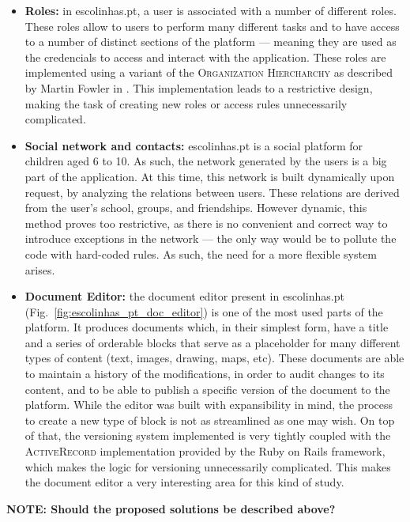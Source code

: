 \begin{itemize}
  \item \textbf{Roles:} in escolinhas.pt, a user is associated with a number of different roles. These roles allow to users to perform many different tasks and to have access to a number of distinct sections of the platform --- meaning they are used as the credencials to access and interact with the application. These roles are implemented using a variant of the \textsc{Organization Hiercharchy} as described by Martin Fowler in \cite{fowler_accountability}. This implementation leads to a restrictive design, making the task of creating new roles or access rules unnecessarily complicated.\\
  
  \item \textbf{Social network and contacts:} escolinhas.pt is a social platform for children aged 6 to 10. As such, the network generated by the users is a big part of the application. At this time, this network is built dynamically upon request, by analyzing the relations between users. These relations are derived from the user's school, groups, and friendships. However dynamic, this method proves too restrictive, as there is no convenient and correct way to introduce exceptions in the network --- the only way would be to pollute the code with hard-coded rules. As such, the need for a more flexible system arises. \\
  
  \item \textbf{Document Editor:} the document editor present in escolinhas.pt (Fig.~\ref{fig:escolinhas_pt_doc_editor}) is one of the most used parts of the platform. It produces documents which, in their simplest form, have a title and a series of orderable blocks that serve as a placeholder for many different types of content (text, images, drawing, maps, etc). These documents are able to maintain a history of the modifications, in order to audit changes to its content, and to be able to publish a specific version of the document to the platform. While the editor was built with expansibility in mind, the process to create a new type of block is not as streamlined as one may wish. On top of that, the versioning system implemented is very tightly coupled with the \textsc{ActiveRecord} implementation provided by the Ruby on Rails framework, which makes the logic for versioning unnecessarily complicated. This makes the document editor a very interesting area for this kind of study. \\
\end{itemize}


\textbf{NOTE: Should the proposed solutions be described above?}

